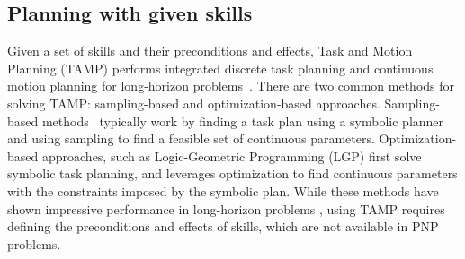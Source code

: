 


\subsection{Planning with given skills}


Given a set of skills and their preconditions and effects, Task and Motion Planning (TAMP) performs integrated discrete task planning and continuous motion planning for long-horizon problems~\cite{garrett2021integrated}. There are two common methods for solving TAMP: sampling-based and optimization-based approaches. Sampling-based methods~\cite{garrett2018ffrob, garrett2020pddlstream,kaelbling2011hierarchical, ren2024extended} typically work by finding a task plan using a symbolic planner and using sampling to find a feasible set of continuous parameters. Optimization-based approaches, such as Logic-Geometric Programming (LGP) \cite{migimatsu2020object, toussaint2015logic, toussaint2018differentiable} first solve symbolic task planning, and leverages optimization to find continuous parameters with the constraints imposed by the symbolic plan. While these methods have shown impressive performance in long-horizon problems \cite{du2023video, kim2022representation, mendez2023embodied, vu2024coast, zhu2021hierarchical}, using TAMP requires defining the preconditions and effects of skills, which are not available in PNP problems.


